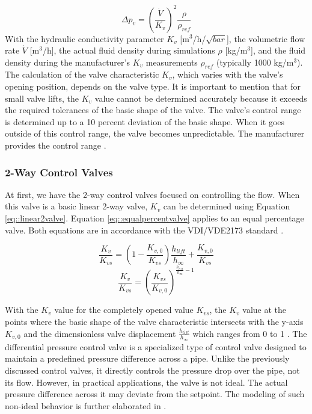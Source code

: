 \begin{equation}\label{eq::realminorpres}
    \Delta p_{v} = \left( \frac{\dot{V}}{K_v} \right)^{2} \frac{\rho}{\rho_{ref}}    
\end{equation}
With the hydraulic conductivity parameter $K_v$  [m$^3$/h/$\sqrt{bar}$], the volumetric flow rate $\dot{V}$ [m$^3$/h], the actual fluid density during simulations $\rho$ [kg/m$^3$], and the fluid density during the manufacturer's $K_v$ measurements $\rho_{ref}$ (typically 1000 kg/m$^3$). The calculation of the valve characteristic $K_v$, which varies with the valve's opening position, depends on the valve type. It is important to mention that for small valve lifts, the $K_v$ value cannot be determined accurately because it exceeds the required tolerances of the basic shape of the valve. The valve's control range is determined up to a 10 percent deviation of the basic shape. When it goes outside of this control range, the valve becomes unpredictable. The manufacturer provides the control range \cite{echtephdthesis}.

\subsubsection{2-Way Control Valves}
At first, we have the 2-way control valves focused on controlling the flow. When this valve is a basic linear 2-way valve, $K_v$ can be determined using Equation \ref{eq::linear2valve}. Equation \ref{eq::equalpercentvalve} applies to an equal percentage valve. Both equations are in accordance with the VDI/VDE2173 standard \cite{VDI/VDE2713}. 

\begin{equation}\label{eq::linear2valve}
    \frac{K_v}{K_{vs}} = \left( 1 -\frac{K_{v,0}}{K_{vs}} \right) \frac{h_{lift}}{h_{\infty}} + \frac{K_{v,0}}{K_{vs}}
\end{equation}
\begin{equation}\label{eq::equalpercentvalve}
    \frac{K_v}{K_{vs}} = {\left(\frac{K_{vs}}{K_{v,0}} \right)}^{\frac{h_{lift}}{h_{\infty}} - 1}
\end{equation}

With the $K_v$ value for the completely opened value $K_{vs}$, the $K_v$ value at the points where the basic shape of the valve characteristic intersects with the y-axis $K_{v,0}$ and the dimensionless valve displacement $\frac{h_{lift}}{h_{\infty}}$ which ranges from 0 to 1 \cite{Artikelphdchris}. The differential pressure control valve is a specialized type of control valve designed to maintain a predefined pressure difference across a pipe. Unlike the previously discussed control valves, it directly controls the pressure drop over the pipe, not its flow. However, in practical applications, the valve is not ideal. The actual pressure difference across it may deviate from the setpoint. The modeling of such non-ideal behavior is further elaborated in \cite{echtephdthesis}.

